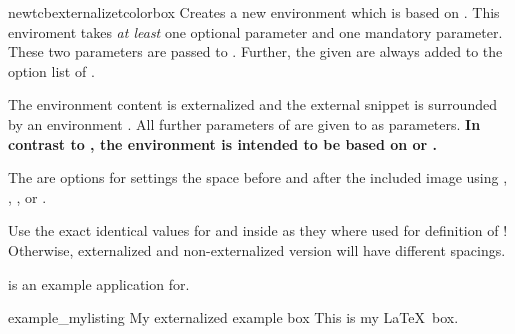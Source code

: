 \begin{docCommand}[doc new=2015-03-11]{newtcbexternalizetcolorbox}{}
  Creates a new environment  which is based on
  . This enviroment takes \emph{at least}
  one optional parameter and one mandatory parameter.
  These two parameters are passed to .
  Further, the given  are always added to the option list of .\par
  The environment content is externalized and the external snippet is surrounded
  by an environment . All further parameters of 
  are given to  as parameters.
  \textbf{In contrast to , the
  environment  is intended to be based on 
  or .}\par
  The  are options for settings the space before
  and after the included image using , ,
  , or .
  \begin{marker}
  Use the exact identical values for  and 
  inside  as they where used for definition of
  ! Otherwise, externalized and non-externalized version will have
  different spacings.
  \end{marker}
   is an example application for.



{
\begin{dispExample}
\begin{exmyownlisting}{example_mylisting}%
  {My externalized example box}
This is my \LaTeX\ box.
\end{exmyownlisting}
\end{dispExample}
}
\end{docCommand}





